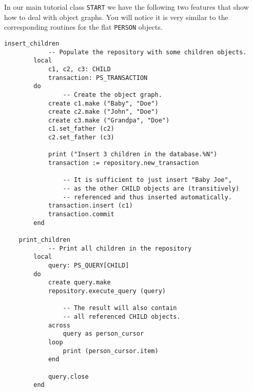 \documentclass[a4paper,12pt]{report}
\begin{document}
In our main tutorial class \lstinline{START} we have the following two features that show how to deal with object graphs. 
You will notice it is very similar to the corresponding routines for the flat \lstinline!PERSON! objects.
\begin{lstlisting}[language=OOSC2Eiffel, captionpos=b, caption={Dealing with object graphs.}, label={lst:references_handling}]
	insert_children
			-- Populate the repository with some children objects.
		local
			c1, c2, c3: CHILD
			transaction: PS_TRANSACTION
		do
				-- Create the object graph.
			create c1.make ("Baby", "Doe")
			create c2.make ("John", "Doe")
			create c3.make ("Grandpa", "Doe")
			c1.set_father (c2)
			c2.set_father (c3)

			print ("Insert 3 children in the database.%N")
			transaction := repository.new_transaction

				-- It is sufficient to just insert "Baby Joe", 
				-- as the other CHILD objects are (transitively) 
				-- referenced and thus inserted automatically.
			transaction.insert (c1)
			transaction.commit
		end

	print_children
			-- Print all children in the repository
		local
			query: PS_QUERY[CHILD]
		do
			create query.make
			repository.execute_query (query)
			
				-- The result will also contain
				-- all referenced CHILD objects.
			across
				query as person_cursor
			loop
				print (person_cursor.item)
			end

			query.close
		end
\end{lstlisting}

% 
 
\end{document}
